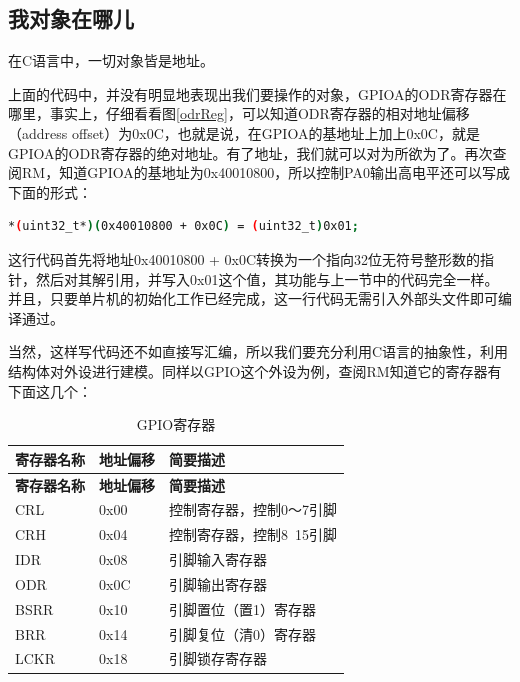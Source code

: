 \subsection{我对象在哪儿}
在C语言中，一切对象皆是地址。
\par 
上面的代码中，并没有明显地表现出我们要操作的对象，GPIOA的ODR寄存器在哪里，事实上，仔细看看图\ref{odrReg}，可以知道ODR寄存器的相对地址偏移（address offset）为0x0C，也就是说，在GPIOA的基地址上加上0x0C，就是GPIOA的ODR寄存器的绝对地址。有了地址，我们就可以对为所欲为了。再次查阅\acs{RM}，知道GPIOA的基地址为0x40010800，所以控制PA0输出高电平还可以写成下面的形式：
\par 
\begin{lstlisting}[language=bash, style=customStyleC, caption=控制PA0输出高电平]
*(uint32_t*)(0x40010800 + 0x0C) = (uint32_t)0x01;
\end{lstlisting}
\par 
这行代码首先将地址0x40010800 + 0x0C转换为一个指向32位无符号整形数的指针，然后对其解引用，并写入0x01这个值，其功能与上一节中的代码完全一样。并且，只要单片机的初始化工作已经完成，这一行代码无需引入外部头文件即可编译通过。
\par 
当然，这样写代码还不如直接写汇编，所以我们要充分利用C语言的抽象性，利用结构体对外设进行建模。同样以GPIO这个外设为例，查阅\acs{RM}知道它的寄存器有下面这几个：
\begin{center}
	\begin{longtable}[l]{| p{30mm} | p{30mm} | p{80mm} |}
		\caption{GPIO寄存器}\\
		\hline 
		\rowcolor{Gray}
		\textbf{寄存器名称} & \textbf{地址偏移} & \textbf{简要描述} \\
		\hline
		\endfirsthead
		
		\hline 
		\rowcolor{Gray}
		\textbf{寄存器名称} & \textbf{地址偏移} & \textbf{简要描述} \\
		\hline
		\endhead
		
		CRL & 0x00 & 控制寄存器，控制0～7引脚 \\
		CRH & 0x04 & 控制寄存器，控制8~15引脚 \\
		IDR & 0x08 & 引脚输入寄存器 \\
		ODR & 0x0C & 引脚输出寄存器 \\
		BSRR & 0x10 & 引脚置位（置1）寄存器 \\
		BRR & 0x14 & 引脚复位（清0）寄存器 \\
		LCKR & 0x18 & 引脚锁存寄存器 \\
		
		\hline
	\end{longtable}
\end{center}
